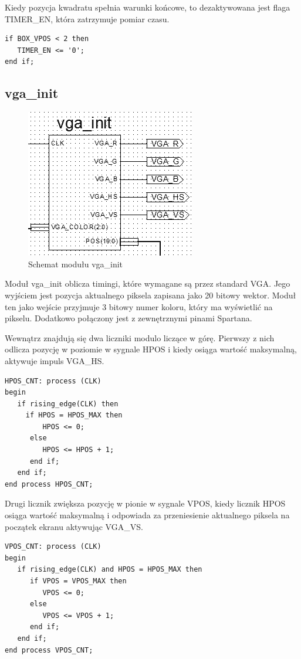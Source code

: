 \documentclass[11pt]{article}
\begin{document}
Kiedy pozycja kwadratu spełnia warunki końcowe, to dezaktywowana jest flaga TIMER\_EN, która zatrzymuje pomiar czasu.

\begin{lstlisting}
if BOX_VPOS < 2 then
   TIMER_EN <= '0';
end if;
\end{lstlisting}



\subsection{vga\_init}

\begin{figure}[H]
\center
\includegraphics[scale=1]{VGA_init.png}
\caption{Schemat modułu vga\_init}
\end{figure}

Moduł vga\_init oblicza timingi, które wymagane są przez standard VGA.
Jego wyjściem jest pozycja aktualnego piksela zapisana jako 20 bitowy wektor.
Moduł ten jako wejście przyjmuje 3 bitowy numer koloru, który ma wyświetlić na pikselu.
Dodatkowo połączony jest z zewnętrznymi pinami Spartana.

Wewnątrz znajdują się dwa liczniki modulo liczące w górę.
Pierwszy z nich odlicza pozycję w poziomie w sygnale HPOS i kiedy osiąga wartość maksymalną, aktywuje impuls VGA\_HS.
\begin{lstlisting}
HPOS_CNT: process (CLK) 
begin
   if rising_edge(CLK) then
     if HPOS = HPOS_MAX then
         HPOS <= 0;
      else
         HPOS <= HPOS + 1;
      end if;
   end if;
end process HPOS_CNT;
\end{lstlisting}
Drugi licznik zwiększa pozycję w pionie w sygnale VPOS, kiedy licznik HPOS osiąga wartość maksymalną i odpowiada za przeniesienie aktualnego piksela na początek ekranu aktywując VGA\_VS.
\begin{lstlisting}
VPOS_CNT: process (CLK) 
begin
   if rising_edge(CLK) and HPOS = HPOS_MAX then
      if VPOS = VPOS_MAX then
         VPOS <= 0;
      else
         VPOS <= VPOS + 1;
      end if;
   end if;
end process VPOS_CNT;
\end{lstlisting}
\end{document}
